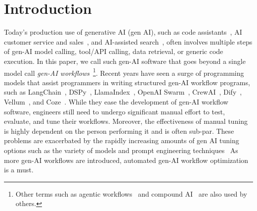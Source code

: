 


\section{Introduction}
\label{sec:intro}

Today's production use of generative AI (gen AI), such as code assistants~\cite{devin}, AI customer service and sales~\cite{salesforce-agentforce}, and AI-assisted search~\cite{vertex_ai_search}, often involves multiple steps of gen-AI model calling, tool/API calling, data retrieval, or generic code execution. 
In this paper, we call such gen-AI software that goes beyond a single model call {\em gen-AI workflows}~\footnote{Other terms such as agentic workflows~\cite{andrew_ng_ai_agentic_workflows} and compound AI~\cite{databricks-compound-ai} are also used by others.}.
Recent years have seen a surge of programming models that assist programmers in writing structured gen-AI workflow programs, such as LangChain~\cite{langchain-repo}, DSPy~\cite{DSPy-repo}, LlamaIndex~\cite{llamaindex}, OpenAI Swarm~\cite{swarm}, CrewAI~\cite{crewai}, Dify~\cite{Dify}, Vellum~\cite{vellum}, and Coze~\cite{coze}.
While they ease the development of gen-AI workflow software, engineers still need to undergo significant manual effort to test, evaluate, and tune their workflows. 
Moreover, the effectiveness of manual tuning is highly dependent on the person performing it and is often sub-par.
These problems are exacerbated by the rapidly increasing amounts of gen AI tuning options such as the variety of models and prompt engineering techniques~\cite{yao2022react,yao2023tree}
As more gen-AI workflows are introduced, automated gen-AI workflow optimization is a must. 

